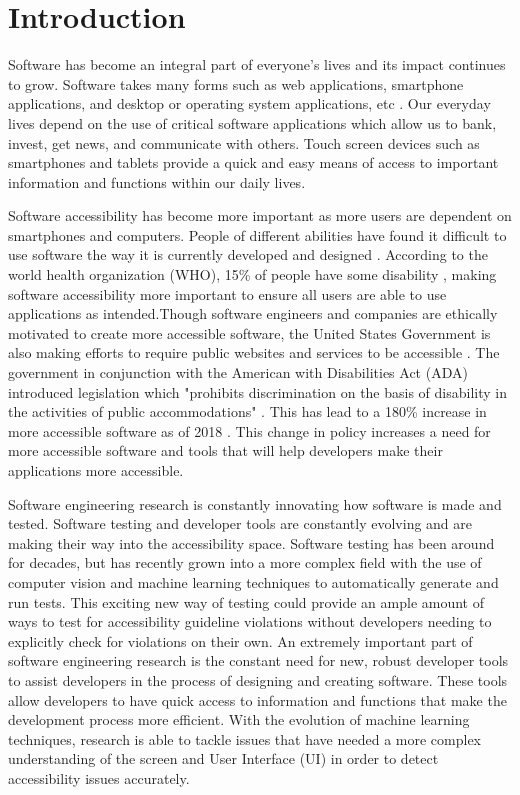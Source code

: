 
\section{Introduction}
\label{sec:introduction}

Software has become an integral part of everyone's lives and its impact continues to grow. Software takes many forms such as web applications, smartphone applications, and desktop or operating system applications, etc \cite{Szpiro16}. Our everyday lives depend on the use of critical software applications which allow us to bank, invest, get news, and communicate with others. Touch screen devices such as smartphones and tablets provide a quick and easy means of access to important information and functions within our daily lives. 


Software accessibility has become more important as more users are dependent on smartphones and computers. People of different abilities have found it difficult to use software the way it is currently developed and designed \cite{Park14}. According to the world health organization (WHO), 15\% of people have some disability \cite{WHO}, making software accessibility more important to ensure all users are able to use applications as intended.Though software engineers and companies are ethically motivated to create more accessible software, the United States Government is also making efforts to require public websites and services to be accessible \cite{ADALaws}. The government in conjunction with the American with Disabilities Act (ADA) introduced legislation which "prohibits discrimination on the basis of disability in the activities of public accommodations" \cite{ADALaws,Alshayban20}. This has lead to a 180\% increase in more accessible software as of 2018 \cite{ADAWeb}. This change in policy increases a need for more accessible software and tools that will help developers make their applications more accessible.

Software engineering research is constantly innovating how software is made and tested. Software testing and developer tools are constantly evolving and are making their way into the accessibility space. Software testing has been around for decades, but has recently grown into a more complex field with the use of computer vision and machine learning techniques to automatically generate and run tests. This exciting new way of testing could provide an ample amount of ways to test for accessibility guideline violations without developers needing to explicitly check for violations on their own. An extremely important part of software engineering research is the constant need for new, robust developer tools to assist developers in the process of designing and creating software. These tools allow developers to have quick access to information and functions that make the development process more efficient. With the evolution of machine learning techniques, research is able to tackle issues that have needed a more complex understanding of the screen and User Interface (UI) in order to detect accessibility issues accurately. 

